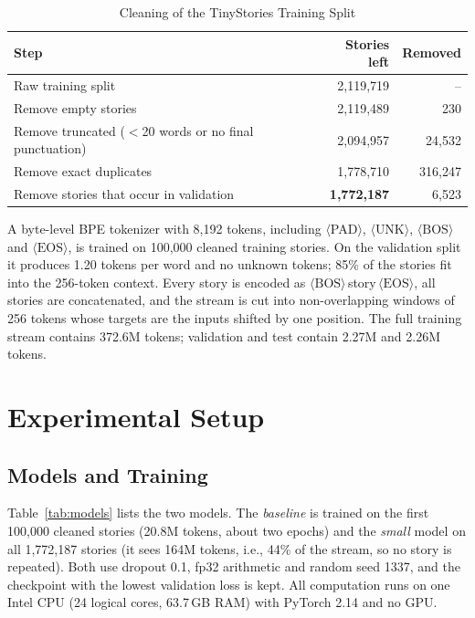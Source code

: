 \documentclass[journal]{IEEEtran}
\newcommand{\BOS}{\langle\mathrm{BOS}\rangle}
\newcommand{\EOS}{\langle\mathrm{EOS}\rangle}
\begin{document}
\begin{table}[!t]
\centering
\caption{Cleaning of the TinyStories Training Split}
\label{tab:cleaning}
\begin{tabular}{@{}lrr@{}}
\toprule
Step & Stories left & Removed \\
\midrule
Raw training split & 2,119,719 & -- \\
Remove empty stories & 2,119,489 & 230 \\
Remove truncated ($<$20 words or no final punctuation) & 2,094,957 & 24,532 \\
Remove exact duplicates & 1,778,710 & 316,247 \\
Remove stories that occur in validation & \textbf{1,772,187} & 6,523 \\
\bottomrule
\end{tabular}
\end{table}

A byte-level BPE tokenizer \cite{gage1994bpe,sennrich2016bpe} with 8,192 tokens, including $\langle$PAD$\rangle$, $\langle$UNK$\rangle$, $\BOS$ and $\EOS$, is trained on 100,000 cleaned training stories. On the validation split it produces 1.20 tokens per word and no unknown tokens; 85\% of the stories fit into the 256-token context. Every story is encoded as $\BOS$\,story\,$\EOS$, all stories are concatenated, and the stream is cut into non-overlapping windows of 256 tokens whose targets are the inputs shifted by one position. The full training stream contains 372.6M tokens; validation and test contain 2.27M and 2.26M tokens.

\section{Experimental Setup}
\label{sec:setup}

\subsection{Models and Training}
Table~\ref{tab:models} lists the two models. The \emph{baseline} is trained on the first 100,000 cleaned stories (20.8M tokens, about two epochs) and the \emph{small} model on all 1,772,187 stories (it sees 164M tokens, i.e., 44\% of the stream, so no story is repeated). Both use dropout 0.1, fp32 arithmetic and random seed 1337, and the checkpoint with the lowest validation loss is kept. All computation runs on one Intel CPU (24 logical cores, 63.7\,GB RAM) with PyTorch 2.14 \cite{paszke2019pytorch} and no GPU.
\end{document}
